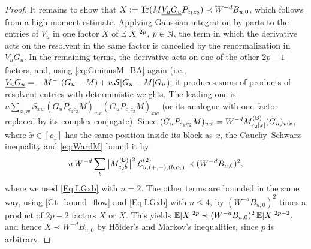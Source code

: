 \begin{proof}
It remains to show that $X:=\tr(M\underline{V_uG_u}P_{c_1c_2})\prec W^{-d}B_{u,0}$, which follows from a high-moment estimate. Applying Gaussian integration by parts to the entries of $V_u$ in one factor $X$ of $\E|X|^{2p}$, $p\in\N$, the term in which the derivative acts on the resolvent in the same factor is cancelled by the renormalization in $\underline{V_uG_u}$. In the remaining terms, the derivative acts on one of the other $2p-1$ factors, and, using \eqref{eq:GminusM_BA} again (i.e., $\underline{V_uG_u}=-M^{-1}(G_u-M)+u\,\cal S[G_u-M]G_u$), it produces sums of products of resolvent entries with deterministic weights. The leading one is $u\sum_{x,w}S_{xw}(G_uP_{c_1c_2}M)_{wx}(G_uP_{c_1c_2}M)_{xw}$ (or its analogue with one factor replaced by its complex conjugate). Since $(G_uP_{c_1c_2}M)_{wx}=W^{-d}M^{(\sB)}_{c_2[x]}(G_u)_{w\tilde x}$, where $\tilde x\in[c_1]$ has the same position inside its block as $x$, the Cauchy--Schwarz inequality and \eqref{eq:WardM} bound it by
\[ u\,W^{-d}\sum_b\big|M^{(\sB)}_{c_2b}\big|^2\,{\cal L}^{(2)}_{u,(+,-),(b,c_1)}\prec (W^{-d}B_{u,0})^2 , \]
where we used \eqref{Eq:LGxb} with $n=2$. The other terms are bounded in the same way, using \eqref{Gt_bound_flow} and \eqref{Eq:LGxb} with $n\le 4$, by $(W^{-d}B_{u,0})^{2}$ times a product of $2p-2$ factors $X$ or $\overline X$. This yields $\E|X|^{2p}\prec (W^{-d}B_{u,0})^{2}\,\E|X|^{2p-2}$, and hence $X\prec W^{-d}B_{u,0}$ by H{\"o}lder's and Markov's inequalities, since $p$ is arbitrary.
\end{proof}

